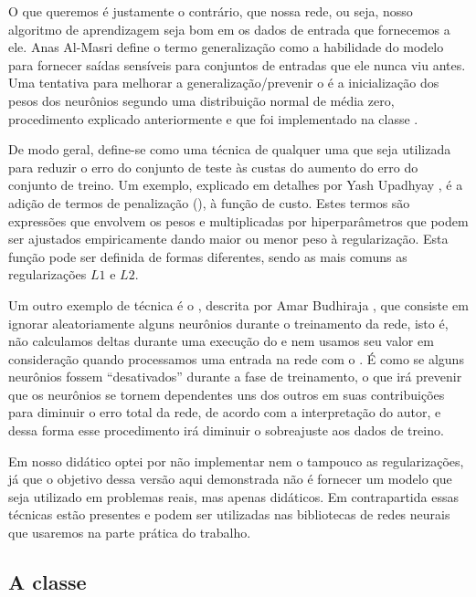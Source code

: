 O que queremos é justamente o contrário, que nossa rede, ou seja, nosso algoritmo de aprendizagem seja bom em  os dados de entrada que fornecemos a ele. Anas Al-Masri \citep{network_1} define o termo generalização como a habilidade do modelo para fornecer saídas sensíveis para conjuntos de entradas que ele nunca viu antes. Uma tentativa para melhorar a generalização/prevenir o  é a inicialização dos pesos dos neurônios segundo uma distribuição normal de média zero, procedimento explicado anteriormente e que foi implementado na classe .

De modo geral, define-se como uma técnica de  qualquer uma que seja utilizada para reduzir o erro do conjunto de teste às custas do aumento do erro do conjunto de treino. Um exemplo, explicado em detalhes por Yash Upadhyay \citep{yash}, é a adição de termos de penalização (), à função de custo. Estes termos são expressões que envolvem os pesos e multiplicadas por hiperparâmetros que podem ser ajustados empiricamente dando maior ou menor peso à regularização. Esta função pode ser definida de formas diferentes, sendo as mais comuns as regularizações $L1$ e $L2$.

Um outro exemplo de técnica é o , descrita por Amar Budhiraja \citep{network_2}, que consiste em ignorar aleatoriamente alguns neurônios durante o treinamento da rede, isto é, não calculamos deltas durante uma execução do  e nem usamos seu valor em consideração quando processamos uma entrada na rede com o . É como se alguns neurônios fossem ``desativados'' durante a fase de treinamento, o que irá prevenir que os neurônios se tornem dependentes uns dos outros em suas contribuições para diminuir o erro total da rede, de acordo com a interpretação do autor, e dessa forma esse procedimento irá diminuir o sobreajuste aos dados de treino.

Em nosso  didático optei por não implementar nem o  tampouco as regularizações, já que o objetivo dessa versão aqui demonstrada não é fornecer um modelo que seja utilizado em problemas reais, mas apenas didáticos. Em contrapartida essas técnicas estão presentes e podem ser utilizadas nas bibliotecas de redes neurais que usaremos na parte prática do trabalho.

\subsection{A classe }
\label{secao:perceptron}

